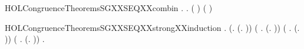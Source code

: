 \newcommand{\HOLCongruenceTheoremsSGXXrules}{\UseVerbatim{HOLCongruenceTheoremsSGXXrules}}
\begin{SaveVerbatim}{HOLCongruenceTheoremsSGXXSEQXXcombin}
\HOLTokenTurnstile{} \HOLSymConst{\HOLTokenForall{}}.   \HOLSymConst{\HOLTokenConj{}}   \HOLSymConst{\HOLTokenImp{}} \HOLSymConst{\HOLTokenForall{}}.   \HOLSymConst{\HOLTokenImp{}}  ( \HOLConst{\HOLTokenCompose} ) \HOLSymConst{\HOLTokenConj{}}  ( \HOLConst{\HOLTokenCompose} )
\end{SaveVerbatim}
\newcommand{\HOLCongruenceTheoremsSGXXSEQXXcombin}{\UseVerbatim{HOLCongruenceTheoremsSGXXSEQXXcombin}}
\begin{SaveVerbatim}{HOLCongruenceTheoremsSGXXSEQXXstrongXXinduction}
\HOLTokenTurnstile{} \HOLSymConst{\HOLTokenForall{}}.
       (\HOLSymConst{\HOLTokenForall{}}.  (\HOLTokenLambda{}. )) \HOLSymConst{\HOLTokenConj{}} (\HOLSymConst{\HOLTokenForall{}} .   \HOLSymConst{\HOLTokenImp{}}  (\HOLTokenLambda{}.   )) \HOLSymConst{\HOLTokenConj{}}
       (\HOLSymConst{\HOLTokenForall{}} .   \HOLSymConst{\HOLTokenConj{}}   \HOLSymConst{\HOLTokenConj{}}   \HOLSymConst{\HOLTokenImp{}}  (\HOLTokenLambda{}.  )) \HOLSymConst{\HOLTokenConj{}}
       (\HOLSymConst{\HOLTokenForall{}} .
              \HOLSymConst{\HOLTokenConj{}}   \HOLSymConst{\HOLTokenConj{}}   \HOLSymConst{\HOLTokenConj{}}   \HOLSymConst{\HOLTokenConj{}}   \HOLSymConst{\HOLTokenConj{}}   \HOLSymConst{\HOLTokenImp{}}
             (\HOLTokenLambda{}.   \HOLSymConst{+}  )) \HOLSymConst{\HOLTokenImp{}}
       \HOLSymConst{\HOLTokenForall{}}.   \HOLSymConst{\HOLTokenConj{}}   \HOLSymConst{\HOLTokenImp{}}  
\end{SaveVerbatim}
